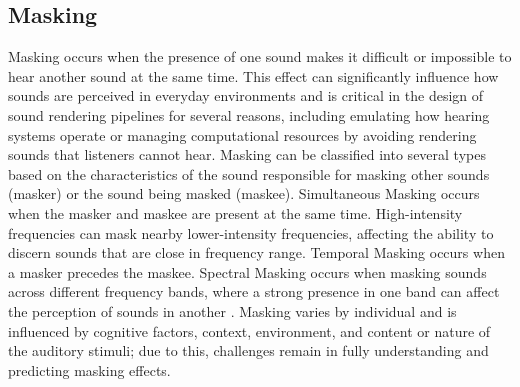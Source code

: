 
\subsection{Masking}
Masking occurs when the presence of one sound makes it difficult or impossible to hear another sound at the same time. This effect can significantly influence how sounds are perceived in everyday environments and is critical in the design of sound rendering pipelines for several reasons, including emulating how hearing systems operate or managing computational resources by avoiding rendering sounds that listeners cannot hear.
Masking can be classified into several types based on the characteristics of the sound responsible for masking other sounds (masker) or the sound being masked (maskee). Simultaneous Masking occurs when the masker and maskee are present at the same time. High-intensity frequencies can mask nearby lower-intensity frequencies, affecting the ability to discern sounds that are close in frequency range. Temporal Masking occurs when a masker precedes the maskee. Spectral Masking occurs when masking sounds across different frequency bands, where a strong presence in one band can affect the perception of sounds in another \citep{howard2013acoustics}.
Masking varies by individual and is influenced by cognitive factors, context, environment, and content or nature of the auditory stimuli; due to this, challenges remain in fully understanding and predicting masking effects.

